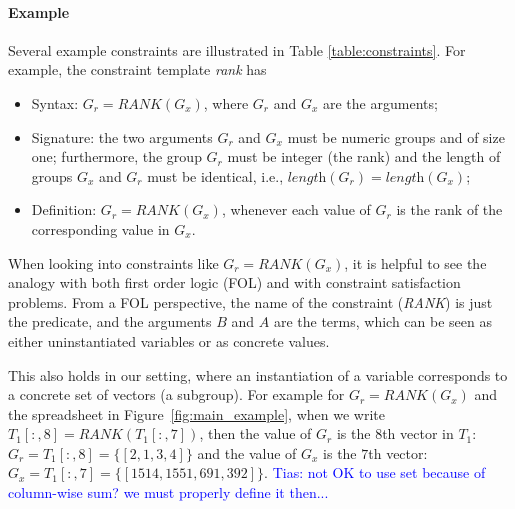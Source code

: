 \documentclass{sig-alternate-05-2015}
\newcommand{\tias}[1]{\textcolor{blue}{{\sc Tias:} #1}\xspace}
\newcommand{\format}[1]{\textit{#1}\xspace}
\newcommand{\CName}{Syntax\xspace}
\newcommand{\CSignature}{Signature\xspace}
\newcommand{\CFunction}{Definition\xspace}
\newcommand{\groups}{\ensuremath{\mathcal{G}}\xspace}
\newcommand{\range}[3]{\ensuremath{#1[#2,#3]}}
\newcommand{\rangeall}{:}
\newcommand{\eccalc}[2]{\ensuremath{#1 = #2}}
\newcommand{\ecrank}[2]{\eccalc{#1}{\textit{RANK}(#2)}}
\newcommand{\plength}{\format{length}}
\begin{document}
\paragraph{Example}
Several example constraints are illustrated in Table \ref{table:constraints}.  For example, the constraint template \textit{rank} has
\begin{itemize}
  \item \CName: \ecrank{G_r}{G_x}, where $G_r$ and $G_x$ are the arguments;
\item \CSignature: the two arguments $G_r$ and $G_x$ must be numeric groups and of size one; furthermore, the group $G_r$ must be integer (the rank) and the length of groups $G_x$ and $G_r$ must be identical, i.e., $\plength(G_r) = \plength(G_x)$;
\item \CFunction: \ecrank{G_r}{G_x}, whenever each value of $G_r$ is the rank of the corresponding value in $G_x$.
\end{itemize}
When looking into constraints like $\ecrank{G_r}{G_x}$, it is helpful to see the analogy with both first order logic (FOL) and with constraint satisfaction problems.
From a FOL perspective, the name of the constraint (\textit{RANK}) is just the predicate, and the arguments $B$ and $A$ are the terms, which can be seen as either uninstantiated variables or as concrete values.

This also holds in our setting, where an instantiation of a variable corresponds to a concrete set of vectors (a subgroup). For example for $\ecrank{G_r}{G_x}$ and the spreadsheet in Figure~\ref{fig:main_example}, when we write $\ecrank{\range{T_1}{\rangeall}{8}}{\range{T_1}{\rangeall}{7}}$, then the value of $G_r$ is the $8$th vector in $T_1$: $G_r = \range{T_1}{\rangeall}{8} = \{[2,1,3,4]\}$ and the value of $G_x$ is the $7$th vector: $G_x = \range{T_1}{\rangeall}{7} = \{[1514, 1551, 691, 392]\}$.
\tias{not OK to use set because of column-wise sum? we must properly define it then...}

\end{document}
